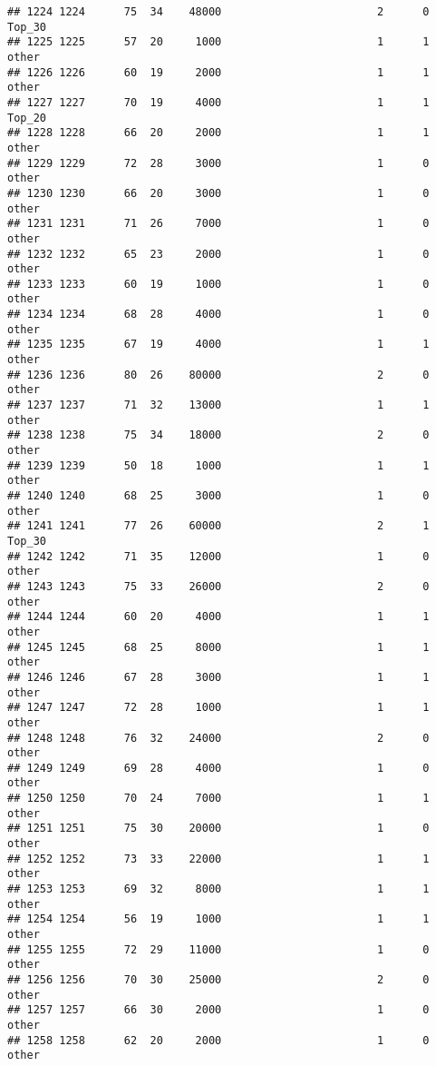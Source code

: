 \documentclass[
]{article}
\begin{document}
\begin{verbatim}
## 1224 1224      75  34    48000                        2      0   Top_30
## 1225 1225      57  20     1000                        1      1    other
## 1226 1226      60  19     2000                        1      1    other
## 1227 1227      70  19     4000                        1      1   Top_20
## 1228 1228      66  20     2000                        1      1    other
## 1229 1229      72  28     3000                        1      0    other
## 1230 1230      66  20     3000                        1      0    other
## 1231 1231      71  26     7000                        1      0    other
## 1232 1232      65  23     2000                        1      0    other
## 1233 1233      60  19     1000                        1      0    other
## 1234 1234      68  28     4000                        1      0    other
## 1235 1235      67  19     4000                        1      1    other
## 1236 1236      80  26    80000                        2      0    other
## 1237 1237      71  32    13000                        1      1    other
## 1238 1238      75  34    18000                        2      0    other
## 1239 1239      50  18     1000                        1      1    other
## 1240 1240      68  25     3000                        1      0    other
## 1241 1241      77  26    60000                        2      1   Top_30
## 1242 1242      71  35    12000                        1      0    other
## 1243 1243      75  33    26000                        2      0    other
## 1244 1244      60  20     4000                        1      1    other
## 1245 1245      68  25     8000                        1      1    other
## 1246 1246      67  28     3000                        1      1    other
## 1247 1247      72  28     1000                        1      1    other
## 1248 1248      76  32    24000                        2      0    other
## 1249 1249      69  28     4000                        1      0    other
## 1250 1250      70  24     7000                        1      1    other
## 1251 1251      75  30    20000                        1      0    other
## 1252 1252      73  33    22000                        1      1    other
## 1253 1253      69  32     8000                        1      1    other
## 1254 1254      56  19     1000                        1      1    other
## 1255 1255      72  29    11000                        1      0    other
## 1256 1256      70  30    25000                        2      0    other
## 1257 1257      66  30     2000                        1      0    other
## 1258 1258      62  20     2000                        1      0    other

\end{verbatim}
\end{document}
